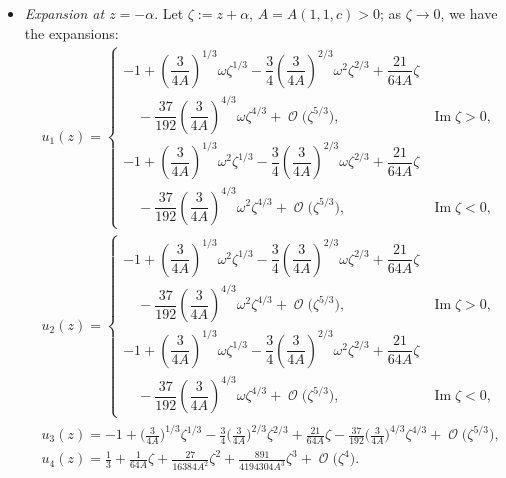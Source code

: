 \documentclass[10pt,a4paper]{amsart}
\DeclareMathOperator{\OO}{\mathcal{O}}
\numberwithin{equation}{section}
\begin{document}
\begin{itemize}
\begin{align*}
\begin{cases}
 \quad{}+ \dfrac{37}{192}\left(\dfrac{3}{4A}\right)^{4/3}\omega^2\zeta^{4/3} + \OO\bigl(\zeta^{5/3}\bigr), & \operatorname{Im}\zeta <0.
 \end{cases}
 \end{align*}
 \item \textit{Expansion at $z= -\alpha$}. Let $\zeta:=z+\alpha$, $A= A(1,1,c)>0$; as $\zeta\to 0$, we have the expansions:
 \begin{align*}
 &u_1(z) =
 \begin{cases}
 -1+ \left(\dfrac{3}{4A}\right)^{1/3}\omega\zeta^{1/3} - \dfrac{3}{4}\left(\dfrac{3}{4A}\right)^{2/3}\omega^2\zeta^{2/3}+ \dfrac{21}{64A}\zeta &\\
 \quad{} - \dfrac{37}{192}\left(\dfrac{3}{4A}\right)^{4/3}\omega\zeta^{4/3} + \OO\bigl(\zeta^{5/3}\bigr), & \operatorname{Im} \zeta >0,\\[1mm]
 -1+ \left(\dfrac{3}{4A}\right)^{1/3}\omega^2\zeta^{1/3} - \dfrac{3}{4}\left(\dfrac{3}{4A}\right)^{2/3}\omega\zeta^{2/3}+ \dfrac{21}{64A}\zeta &\\
 \quad{} - \dfrac{37}{192}\left(\dfrac{3}{4A}\right)^{4/3}\omega^2\zeta^{4/3} + \OO\bigl(\zeta^{5/3}\bigr), & \operatorname{Im} \zeta <0,
 \end{cases}\\
 &u_2(z) =
 \begin{cases}
 -1+ \left(\dfrac{3}{4A}\right)^{1/3}\omega^2\zeta^{1/3} - \dfrac{3}{4}\left(\dfrac{3}{4A}\right)^{2/3}\omega\zeta^{2/3}+ \dfrac{21}{64A}\zeta &\\
 \quad{} - \dfrac{37}{192}\left(\dfrac{3}{4A}\right)^{4/3}\omega^2\zeta^{4/3} + \OO\bigl(\zeta^{5/3}\bigr),
 & \operatorname{Im} \zeta >0,\\[1mm]
 -1+ \left(\dfrac{3}{4A}\right)^{1/3}\omega\zeta^{1/3} - \dfrac{3}{4}\left(\dfrac{3}{4A}\right)^{2/3}\omega^2\zeta^{2/3}+ \dfrac{21}{64A}\zeta &\\
 \quad{}- \dfrac{37}{192}\left(\dfrac{3}{4A}\right)^{4/3}\omega\zeta^{4/3} + \OO\bigl(\zeta^{5/3}\bigr), & \operatorname{Im} \zeta <0,
 \end{cases}\\
 &u_3(z) = -1+ \biggl(\frac{3}{4A}\biggr)^{1/3}\! \zeta^{1/3}\! - \frac{3}{4}\biggl(\frac{3}{4A}\biggr)^{2/3}\! \zeta^{2/3}\! + \frac{21}{64A} \zeta - \frac{37}{192}\biggl(\frac{3}{4A}\biggr)^{4/3}\zeta^{4/3}\! + \OO\bigl(\zeta^{5/3}\bigr),\\
 &u_4(z) = \frac{1}{3} + \frac{1}{64A}\zeta + \frac{27}{16384A^2}\zeta^2 + \frac{891}{4194304A^3}\zeta^3 + \OO\bigl(\zeta^4\bigr).
 \end{align*}
\end{itemize}
\end{document}
